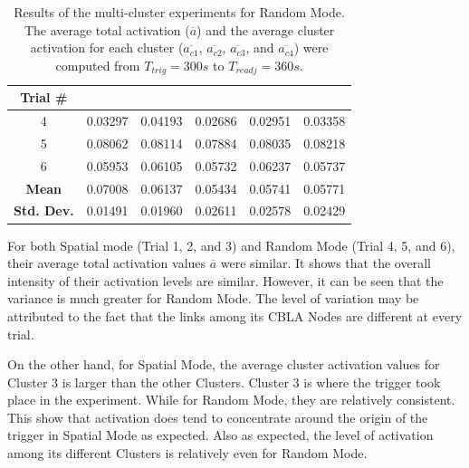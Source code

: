 \begin{table}[!htb]
	\caption[Results of the multi-cluster experiment for Random Mode]{Results of the multi-cluster experiments for Random Mode. The average total activation ($\overline{a}$) and the average cluster activation for each cluster ($\overline{a_{c1}}$, $\overline{a_{c2}}$, $\overline{a_{c3}}$, and $\overline{a_{c4}}$) were computed from $T_{trig} = 300s$ to  $T_{readj} = 360s$. }
	\begin{center}
		\begin{tabular}{ | c | c | c | c | c | c |} 
			\hline
			\textbf{Trial \#} & \boldmath{$\overline{a}$}  & \boldmath{$\overline{a_{c1}}$}  & \boldmath{$\overline{a_{c2}}$} & \boldmath{$\overline{a_{c3}}$} & \boldmath{$\overline{a_{c4}}$} \\ 
			\hline
			\hline
			4 & 0.03297	& 0.04193 &	0.02686 & 0.02951 & 0.03358 \\
			\hline
			5 &	0.08062 & 0.08114 & 0.07884 & 0.08035 & 0.08218 \\
			\hline
			6 &	0.05953 & 0.06105 &	0.05732 & 0.06237 & 0.05737 \\
			\hlineB{3}	
			\textbf{Mean} & 0.07008	& 0.06137 &	0.05434	& 0.05741 & 0.05771  \\
			\hline
			\textbf{Std. Dev.} & 0.01491 & 0.01960 & 0.02611 & 0.02578 & 0.02429 \\
			\hline	
		\end{tabular}
	\end{center}
	\label{table:multi-cluster-results-random}
\end{table}

For both Spatial mode (Trial 1, 2, and 3) and Random Mode (Trial 4, 5, and 6), their average total activation values $\overline{a}$ were similar. It shows that the overall intensity of their activation levels are similar. However, it can be seen that the variance is much greater for Random Mode. The level of variation may be attributed to the fact that the links among its CBLA Nodes are different at every trial.

On the other hand, for Spatial Mode, the average cluster activation values for Cluster 3 is larger than the other Clusters. Cluster 3 is where the trigger took place in the experiment. While for Random Mode, they are relatively consistent. This show that activation does tend to concentrate around the origin of the trigger in Spatial Mode as expected. Also as expected, the level of activation among its different Clusters is relatively even for Random Mode. 

